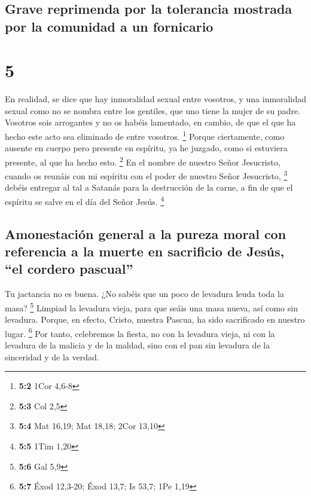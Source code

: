 \hypertarget{grave-reprimenda-por-la-tolerancia-mostrada-por-la-comunidad-a-un-fornicario}{%
\subsection{Grave reprimenda por la tolerancia mostrada por la comunidad
a un
fornicario}\label{grave-reprimenda-por-la-tolerancia-mostrada-por-la-comunidad-a-un-fornicario}}

\hypertarget{section-4}{%
\section{5}\label{section-4}}

 En realidad, se dice que hay inmoralidad sexual entre
vosotros, y una inmoralidad sexual como no se nombra entre los gentiles,
que uno tiene la mujer de su padre.  Vosotros sois
arrogantes y no os habéis lamentado, en cambio, de que el que ha hecho
este acto sea eliminado de entre vosotros. \footnote{\textbf{5:2} 1Cor
  4,6-8}  Porque ciertamente, como ausente en cuerpo pero
presente en espíritu, ya he juzgado, como si estuviera presente, al que
ha hecho esto. \footnote{\textbf{5:3} Col 2,5}  En el
nombre de nuestro Señor Jesucristo, cuando os reunáis con mi espíritu
con el poder de nuestro Señor Jesucristo, \footnote{\textbf{5:4} Mat
  16,19; Mat 18,18; 2Cor 13,10}  debéis entregar al tal a
Satanás para la destrucción de la carne, a fin de que el espíritu se
salve en el día del Señor Jesús. \footnote{\textbf{5:5} 1Tim 1,20}

\hypertarget{amonestaciuxf3n-general-a-la-pureza-moral-con-referencia-a-la-muerte-en-sacrificio-de-jesuxfas-el-cordero-pascual}{%
\subsection{Amonestación general a la pureza moral con referencia a la
muerte en sacrificio de Jesús, ``el cordero
pascual''}\label{amonestaciuxf3n-general-a-la-pureza-moral-con-referencia-a-la-muerte-en-sacrificio-de-jesuxfas-el-cordero-pascual}}

 Tu jactancia no es buena. ¿No sabéis que un poco de
levadura leuda toda la masa? \footnote{\textbf{5:6} Gal 5,9}
 Limpiad la levadura vieja, para que seáis una masa nueva,
así como sin levadura. Porque, en efecto, Cristo, nuestra Pascua, ha
sido sacrificado en nuestro lugar. \footnote{\textbf{5:7} Éxod 12,3-20;
  Éxod 13,7; Is 53,7; 1Pe 1,19}  Por tanto, celebremos la
fiesta, no con la levadura vieja, ni con la levadura de la malicia y de
la maldad, sino con el pan sin levadura de la sinceridad y de la verdad.

